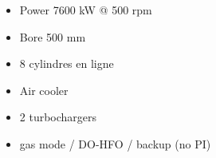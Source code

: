 \documentclass[12pt,a4paper]{article}
\begin{document}
\begin{itemize}
 \item Power 7600 kW @ 500 rpm
 \item Bore 500 mm
 \item 8 cylindres en ligne
 \item Air cooler
 \item 2 turbochargers 
 \item gas mode / DO-HFO / backup (no PI)
\end{itemize}
%
%
%  
\end{document}
